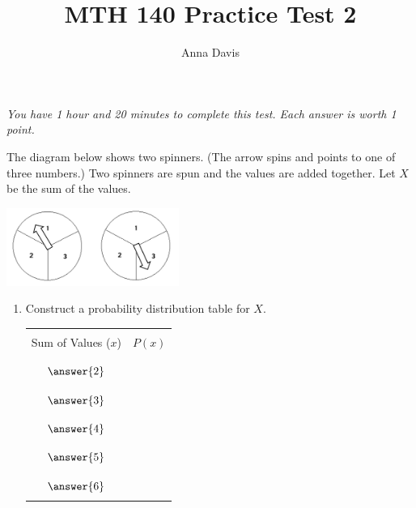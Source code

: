 \documentclass{ximera}
\author{Anna Davis} \title{MTH 140 Practice Test 2}
\begin{document}
\maketitle
 \textit{You have 1 hour and 20 minutes to complete this test.  Each answer is worth 1 point.}
\begin{problem}\label{prob:test2prob1}
The diagram below shows two spinners.  (The arrow spins and points to one of three numbers.)  Two spinners are spun and the values are added together.  Let $X$ be the sum of the values.  

\begin{image}
   
\includegraphics[height=1in]{test2pic1.jpg}~
 
\end{image}



\begin{enumerate}
    \item Construct a probability distribution table for $X$.
    
    \begin{center}
\begin{tabular}{|c|c|}
 \hline
 &   \\
 Sum of Values ($x$) & $P(x)$ \\
 &  \\
  \hline
  & \\
 \quad $\answer{2}$\quad& \\
  & \\
 \hline
  & \\
 \quad $\answer{3}$ & \\
  & \\
 \hline
  & \\
  \quad $\answer{4}$ & \\
  & \\
 \hline
  & \\
 \quad $\answer{5}$  & \\
  &\\
 \hline
  & \\
 \quad $\answer{6}$  & \\
  &\\
 \hline
\end{tabular}
\end{center}
    

\end{enumerate}
\end{problem}
\end{document}
